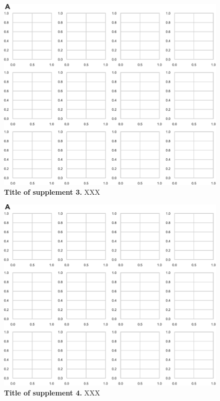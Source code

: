 \documentclass[11pt]{article}
\begin{document}
\begin{figure}
\hypertarget{fig:supp3}{%
\centering
\includegraphics{./figures/figureS3.pdf}
\caption{\textbf{Title of supplement 3.} XXX}\label{fig:supp3}
}
\end{figure}

\begin{figure}
\hypertarget{fig:supp4}{%
\centering
\includegraphics{./figures/figureS4.pdf}
\caption{\textbf{Title of supplement 4.} XXX}\label{fig:supp4}
}
\end{figure}
\end{document}
